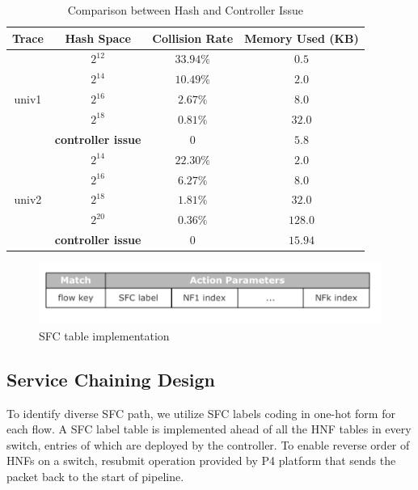 \documentclass[10pt, conference, letterpaper]{IEEEtran}
\begin{document}
\begin{table}[t]
\caption{Comparison between Hash and Controller Issue}
\begin{center}
\begin{tabular}{|c|c|c|c|}
\hline
\textbf{Trace}&\textbf{Hash Space}&\textbf{Collision Rate}&\textbf{Memory Used (KB)}\\
\hline
\multirow{5}{*}{univ1} & $2^{12}$ & $33.94\%$ & $0.5$ \\
\cline{2-4}
~ & $2^{14}$ & $10.49\%$ & $2.0$ \\
\cline{2-4}
~ & $2^{16}$ & $2.67\%$ & $8.0$ \\
\cline{2-4}
~ & $2^{18}$ & $0.81\%$ & $32.0$ \\
\cline{2-4}
~ & \textbf{controller issue} & $0$ & $5.8$ \\
\hline
\multirow{5}{*}{univ2} & $2^{14}$ & $22.30\%$ & $2.0$ \\
\cline{2-4}
~ & $2^{16}$ & $6.27\%$ & $8.0$ \\
\cline{2-4}
~ & $2^{18}$ & $1.81\%$ & $32.0$ \\
\cline{2-4}
~ & $2^{20}$ & $0.36\%$ & $128.0$ \\
\cline{2-4}
~ & \textbf{controller issue} & $0$ & $15.94$ \\
\hline
\end{tabular}
\label{hash}
\end{center}
\end{table}

\begin{figure}[t]
\centerline{\includegraphics[scale=0.4]{src/sfc.png}}
\caption{SFC table implementation}
\label{sfc}
\end{figure}



\subsection{Service Chaining Design}
To identify diverse SFC path, we utilize SFC labels coding in one-hot form for each flow. A SFC label table is implemented ahead of all the HNF tables in every switch, entries of which are deployed by the controller. To enable reverse order of HNFs on a switch, resubmit operation provided by P4 platform that sends the packet back to the start of pipeline.
\end{document}

